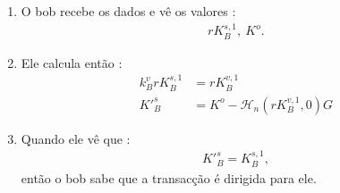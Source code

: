 \begin{enumerate}
	\item O bob recebe os dados e vê os valores :
    \begin{align*}
    r K_B^{s,1},\ K^o.
	\end{align*}
    \item Ele calcula então :
    \begin{align*}
    k_B^v r K_B^{s,1} &= r K_B^{v,1}\\
    K'^{s}_B &= K^o - \mathcal{H}_n(r K_B^{v,1},0)G	
    \end{align*}
    \item Quando ele vê que :
    \begin{align*}
    K'^{s}_B = K^{s,1}_B ,	
    \end{align*}
    então o bob sabe que a transacção é dirigida para ele.%
	

\end{enumerate}
